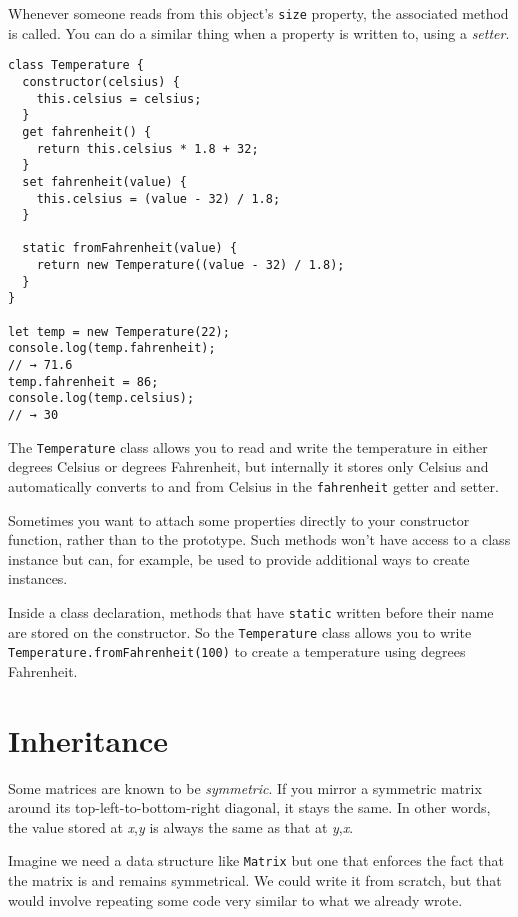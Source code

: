 Whenever someone reads from this object's \lstinline`size` property, the associated method is called. You can do a similar thing when a property is written to, using a \emph{setter}.

\begin{lstlisting}
class Temperature {
  constructor(celsius) {
    this.celsius = celsius;
  }
  get fahrenheit() {
    return this.celsius * 1.8 + 32;
  }
  set fahrenheit(value) {
    this.celsius = (value - 32) / 1.8;
  }

  static fromFahrenheit(value) {
    return new Temperature((value - 32) / 1.8);
  }
}

let temp = new Temperature(22);
console.log(temp.fahrenheit);
// → 71.6
temp.fahrenheit = 86;
console.log(temp.celsius);
// → 30
\end{lstlisting}
\noindent

The \lstinline`Temperature` class allows you to read and write the temperature in either degrees Celsius or degrees Fahrenheit, but internally it stores only Celsius and automatically converts to and from Celsius in the \lstinline`fahrenheit` getter and setter.

Sometimes you want to attach some properties directly to your constructor function, rather than to the prototype. Such methods won't have access to a class instance but can, for example, be used to provide additional ways to create instances.

Inside a class declaration, methods that have \lstinline`static` written before their name are stored on the constructor. So the \lstinline`Temperature` class allows you to write \lstinline`Temperature.fromFahrenheit(100)` to create a temperature using degrees Fahrenheit.

\section{Inheritance}

Some matrices are known to be \emph{symmetric}. If you mirror a symmetric matrix around its top-left-to-bottom-right diagonal, it stays the same. In other words, the value stored at \emph{x},\emph{y} is always the same as that at \emph{y},\emph{x}.

Imagine we need a data structure like \lstinline`Matrix` but one that enforces the fact that the matrix is and remains symmetrical. We could write it from scratch, but that would involve repeating some code very similar to what we already wrote.

